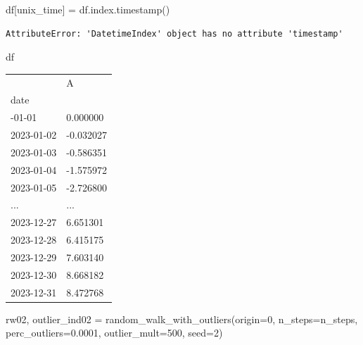 \documentclass[
  letterpaper,
  DIV=11,
  numbers=noendperiod,
  oneside]{scrreprt}
\newenvironment{Shaded}{\begin{snugshade}}{\end{snugshade}}
\newcommand{\DecValTok}[1]{\textcolor[rgb]{0.68,0.00,0.00}{#1}}
\newcommand{\FloatTok}[1]{\textcolor[rgb]{0.68,0.00,0.00}{#1}}
\newcommand{\NormalTok}[1]{\textcolor[rgb]{0.00,0.23,0.31}{#1}}
\newcommand{\OperatorTok}[1]{\textcolor[rgb]{0.37,0.37,0.37}{#1}}
\newcommand{\StringTok}[1]{\textcolor[rgb]{0.13,0.47,0.30}{#1}}
\begin{document}
\begin{Shaded}
\begin{Highlighting}[]
\NormalTok{df[}\StringTok{\textquotesingle{}unix\_time\textquotesingle{}}\NormalTok{] }\OperatorTok{=}\NormalTok{ df.index.timestamp()}
\end{Highlighting}
\end{Shaded}

\begin{verbatim}
AttributeError: 'DatetimeIndex' object has no attribute 'timestamp'
\end{verbatim}

\begin{Shaded}
\begin{Highlighting}[]
\NormalTok{df}
\end{Highlighting}
\end{Shaded}

\begin{longtable}[]{@{}ll@{}}
\toprule\noalign{}
& A \\
date & \\
\midrule\noalign{}
\endhead
\bottomrule\noalign{}
\endlastfoot
2023-01-01 & 0.000000 \\
2023-01-02 & -0.032027 \\
2023-01-03 & -0.586351 \\
2023-01-04 & -1.575972 \\
2023-01-05 & -2.726800 \\
... & ... \\
2023-12-27 & 6.651301 \\
2023-12-28 & 6.415175 \\
2023-12-29 & 7.603140 \\
2023-12-30 & 8.668182 \\
2023-12-31 & 8.472768 \\
\end{longtable}

\begin{Shaded}
\begin{Highlighting}[]
\NormalTok{rw02, outlier\_ind02 }\OperatorTok{=}\NormalTok{ random\_walk\_with\_outliers(origin}\OperatorTok{=}\DecValTok{0}\NormalTok{,}
\NormalTok{                                            n\_steps}\OperatorTok{=}\NormalTok{n\_steps,}
\NormalTok{                                            perc\_outliers}\OperatorTok{=}\FloatTok{0.0001}\NormalTok{,}
\NormalTok{                                            outlier\_mult}\OperatorTok{=}\DecValTok{500}\NormalTok{,}
\NormalTok{                                            seed}\OperatorTok{=}\DecValTok{2}\NormalTok{)}
\end{Highlighting}
\end{Shaded}
\end{document}
